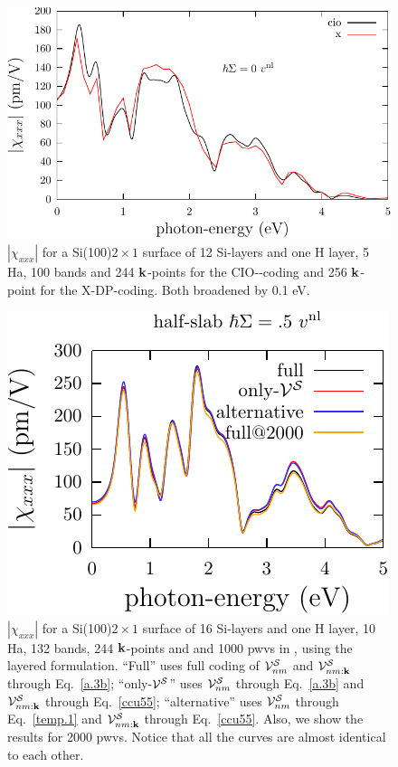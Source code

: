 \begin{figure}[b]
\centering
\includegraphics[scale=.7]{plots/shg-si-2x1-n-vs-b}
\caption{$|\chi_{xxx}|$ 
for a Si(100)$2\times 1$ surface of 12 Si-layers and one H layer, 5
Ha, 100 bands and 244 $\mathbf{k}$-points for the CIO-\tiniba-coding
and 256 $\mathbf{k}$-point for the X-DP\copyr-coding.
Both broadened by 0.1 eV.   
}
\label{si-2x1-n-vs-b}
\end{figure}
\begin{figure}[b]
\centering 
\includegraphics[scale=1.5]{plots/shg-si-2x1-16-compa}
\caption{$|\chi_{xxx}|$ 
for a Si(100)$2\times 1$ surface of 16 Si-layers and one H layer, 10 
Ha, 132 bands, 244 $\mathbf{k}$-points and and 1000 pwvs in \depe, using 
the layered formulation. 
``Full'' uses full coding of 
${\mathbf{\cal V}}^{\cal S}_{nm}$ and 
${\mathbf{\cal V}}^{\cal S}_{nm:\mathbf{k}}$ through Eq.~\eqref{a.3b};
``only-${\mathbf{\cal V}}^{\cal S}$'' uses 
${\mathbf{\cal V}}^{\cal S}_{nm}$ through Eq.~\eqref{a.3b} and 
${\mathbf{\cal V}}^{\cal S}_{nm:\mathbf{k}}$ through Eq.~\eqref{ccu55};
``alternative'' uses ${\mathbf{\cal V}}^{\cal S}_{nm}$ through Eq.~\eqref{temp.1} and 
${\mathbf{\cal V}}^{\cal S}_{nm:\mathbf{k}}$ through Eq.~\eqref{ccu55}.
Also, we show the results for 2000 pwvs.
Notice that all the curves are almost identical to each other. 
}
\label{si-2x1-compa}
\end{figure}


